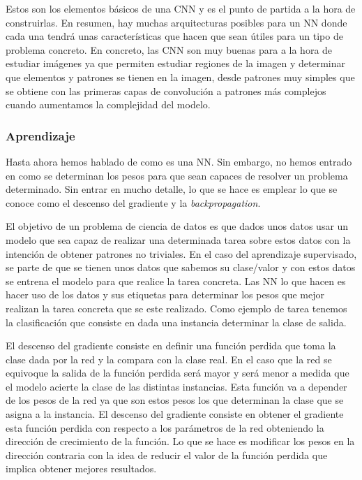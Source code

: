 \documentclass[a4paper,12pt,twoside,titlepage]{article}
\begin{document}
Estos son los elementos básicos de una CNN y es el punto de partida a la hora de construirlas. En resumen, hay muchas arquitecturas posibles para un NN donde cada una tendrá unas características que hacen que sean útiles para un tipo de problema concreto. En concreto, las CNN son muy buenas para a la hora de estudiar imágenes ya que permiten estudiar regiones de la imagen y determinar que elementos y patrones se tienen en la imagen, desde patrones muy simples que se obtiene con las primeras capas de convolución a patrones más complejos cuando aumentamos la complejidad del modelo.

\subsubsection*{Aprendizaje}

Hasta ahora hemos hablado de como es una NN. Sin embargo, no hemos entrado en como se determinan los pesos para que sean capaces de resolver un problema determinado. Sin entrar en mucho detalle, lo que se hace es emplear lo que se conoce como el descenso del gradiente y la \textit{backpropagation}.

El objetivo de un problema de ciencia de datos es que dados unos datos usar un modelo que sea capaz de realizar una determinada tarea sobre estos datos con la intención de obtener patrones no triviales. En el caso del aprendizaje supervisado, se parte de que se tienen unos datos que sabemos su clase/valor y con estos datos se entrena el modelo para que realice la tarea concreta. Las NN lo que hacen es hacer uso de los datos y sus etiquetas para determinar los pesos que mejor realizan la tarea concreta que se este realizado. Como ejemplo de tarea tenemos la clasificación que consiste en dada una instancia determinar la clase de salida.

El descenso del gradiente consiste en definir una función perdida que toma la clase dada por la red y la compara con la clase real. En el caso que la red se equivoque la salida de la función perdida será mayor y será menor a medida que el modelo acierte la clase de las distintas instancias. Esta función va a depender de los pesos de la red ya que son estos pesos los que determinan la clase que se asigna a la instancia. El descenso del gradiente consiste en obtener el gradiente esta función perdida con respecto a los parámetros de la red obteniendo la dirección de crecimiento de la función. Lo que se hace es modificar los pesos en la dirección contraria con la idea de reducir el valor de la función perdida que implica obtener mejores resultados.
\end{document}
